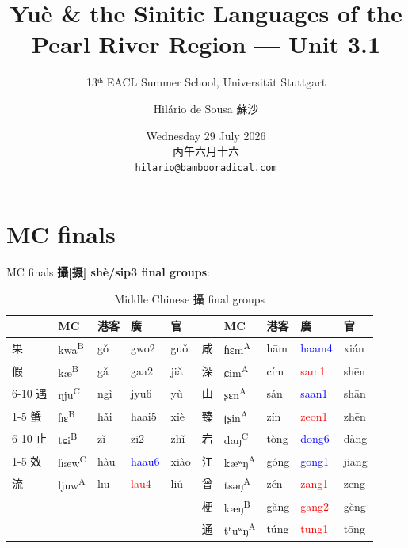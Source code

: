 \documentclass{beamer}
\title[Pearl River Sinitic]{Yuè \& the Sinitic Languages of the Pearl River Region --- Unit 3.1}
\subtitle{13ᵗʰ EACL Summer School, Universität Stuttgart}
\author{Hilário de Sousa 蘇沙}
\institute{EHESS–CRLAO \\ {\tiny membre associé}}
\date{Wednesday 29 July 2026 \\ 丙午六月十六 \\ {\footnotesize \texttt{hilario@bambooradical.com}}}
\begin{document}
\begin{frame}
  \titlepage
\end{frame}

\section{MC finals}

\begin{frame}[fragile]{MC finals}
\textbf{攝[摄] shè/sip3 final groups}:
{\small
\begin{table}
    \centering
    \renewcommand{\arraystretch}{1.2}
    \begin{tabular}{l l l l l|l l l l l}
         & MC & 港客 & 廣 & 官 & & MC & 港客 & 廣 & 官\\ \hline  
        果 & kwa\textsuperscript{B} & gǒ & gwo2 & guǒ & 咸 & ɦɛm\textsuperscript{A} & hām & \textcolor{blue}{haam4} & xián\\
        假 & kæ\textsuperscript{B} & gǎ & gaa2 & jiǎ & 深 & ɕim\textsuperscript{A} & cím & \textcolor{red}{sam1} & shēn\\ \cline{6-10}
        遇 & ŋju\textsuperscript{C} & ngì & jyu6 & yù & 山 & ʂɛn\textsuperscript{A} & sán & \textcolor{blue}{saan1} & shān\\ \cline{1-5}
        蟹 & ɦɛ\textsuperscript{B} & hǎi & haai5 & xiè & 臻 & ʈʂin\textsuperscript{A} & zín & \textcolor{red}{zeon1} & zhēn\\ \cline{6-10}
        止 & tɕi\textsuperscript{B} & zǐ & zi2 & zhǐ & 宕 & daŋ\textsuperscript{C} & tòng & \textcolor{blue}{dong6} & dàng\\ \cline{1-5}
        效 & ɦæw\textsuperscript{C} & hàu & \textcolor{blue}{haau6} & xiào & 江 & kæʷŋ\textsuperscript{A} & góng & \textcolor{blue}{gong1} & jiāng\\
        流 & ljuw\textsuperscript{A} & līu & \textcolor{red}{lau4} & liú & 曾 & tsəŋ\textsuperscript{A} & zén & \textcolor{red}{zang1} & zēng\\
         & & & & & 梗 & kæŋ\textsuperscript{B}& gǎng & \textcolor{red}{gang2} & gěng\\
         & & & & & 通 & tʰuʷŋ\textsuperscript{A} & túng & \textcolor{red}{tung1} & tōng\\
    \end{tabular}
    \caption{Middle Chinese 攝 final groups}
\end{table}}

\end{frame}
\end{document}
